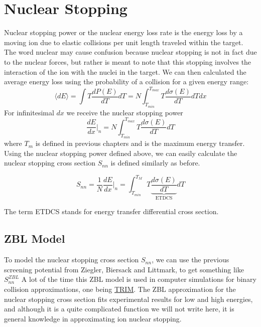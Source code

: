 \section{Nuclear Stopping}\label{sec:nuclear-stopping}
Nuclear stopping power or the nuclear energy loss rate is the energy loss by a moving ion due to elastic collisions per unit length traveled within the target.
The word nuclear may cause confusion because nuclear stopping is not in fact due to the nuclear forces, but rather is meant to note that this stopping involves the interaction of the ion with the nuclei in the target.
We can then calculated the average energy loss using the probability of a collision for a given energy range: $$ \langle dE \rangle = \int T \frac{dP(E)}{dT}dT = N \int_{T_{min}}^{T_{max}} T \frac{d\sigma (E)}{dT}dTdx$$
For infinitesimal $dx$ we receive the nuclear stopping power $$ \frac{dE}{dx} |_n = N \int_{T_{min}}^{T_{max}} T\frac{d\sigma(E)}{dT}dT$$ where $T_m$ is defined in previous chapters and is the maximum energy transfer.
Using the nuclear stopping power defined above, we can easily calculate the nuclear stopping cross section $S_{nn}$ is defined similarly as before.

\begin{equation}
	S_{nn} = \frac{1}{N} \frac{dE}{dx}|_n = \int_{T_{min}}^{T_{M}} T \underbrace{\frac{d\sigma (E)}{dT}}_\textrm{ETDCS} dT
\end{equation}

The term ETDCS stands for energy transfer differential cross section.
\subsection{ZBL Model}\label{subsec:zbl-model}
To model the nuclear stopping cross section $S_{nn}$, we can use the previous screening potential from Ziegler, Biersack and Littmark, to get something like $S_{nn}^{ZBL}$
A lot of the time this ZBL model is used in computer simulations for binary collision approximations, one being \href{http://www.helsinki.fi/~knordlun/TRIM-answer}{TRIM}.
The ZBL approximation for the nuclear stopping cross section fits experimental results for low and high energies, and although it is a quite complicated function we will not write here, it is general knowledge in approximating ion nuclear stopping.

